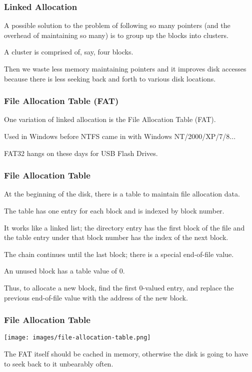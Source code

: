 \begin{frame}
\frametitle{Linked Allocation}

A possible solution to the problem of following so many pointers (and the overhead of maintaining so many) is to group up the blocks into \alert{clusters}.

A cluster is comprised of, say, four blocks. 

Then we waste less memory maintaining pointers and it improves disk accesses because there is less seeking back and forth to various disk locations.

\end{frame}

\begin{frame}
\frametitle{File Allocation Table (FAT)}

One variation of linked allocation is the File Allocation Table (FAT).

Used in Windows before NTFS came in with Windows NT/2000/XP/7/8...

FAT32 hangs on these days for USB Flash Drives.

\end{frame}

\begin{frame}
\frametitle{File Allocation Table}


At the beginning of the disk, there is a table to maintain file allocation data. 

The table has one entry for each block and is indexed by block number. 

It works like a linked list; the directory entry has the first block of the file and the table entry under that block number has the index of the next block. 

The chain continues until the last block; there is a special end-of-file value. 

An unused block has a table value of 0. 

Thus, to allocate a new block, find the first 0-valued entry, and replace the previous end-of-file value with the address of the new block.

\end{frame}

\begin{frame}
\frametitle{File Allocation Table}

\begin{center}
	\texttt{[image: images/file-allocation-table.png]}
\end{center}

The FAT itself should be cached in memory, otherwise the disk is going to have to seek back to it unbearably often.

\end{frame}



